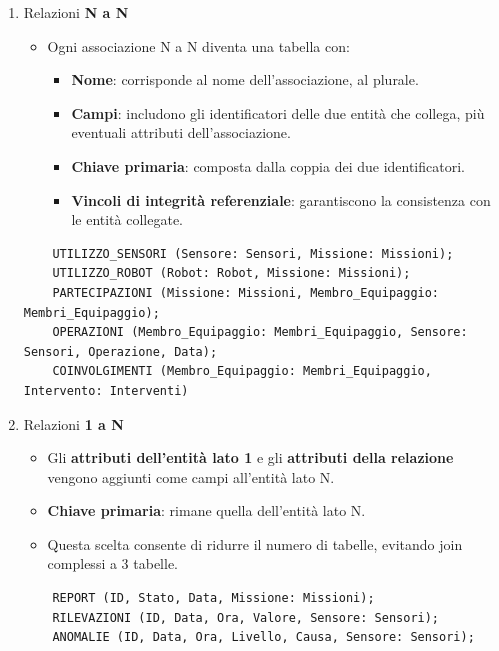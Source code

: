 \documentclass{article}
\begin{document}
\begin{enumerate}
    \item Relazioni \textbf{N a N}
    \begin{itemize}
        \item Ogni associazione N a N diventa una tabella con:
        \begin{itemize}
            \item \textbf{Nome}: corrisponde al nome dell’associazione, al plurale.
            \item \textbf{Campi}: includono gli identificatori delle due entità che collega, più eventuali attributi dell’associazione.
            \item \textbf{Chiave primaria}: composta dalla coppia dei due identificatori.
            \item \textbf{Vincoli di integrità referenziale}: garantiscono la consistenza con le entità collegate.
        \end{itemize}
    \end{itemize}
    \begin{verbatim}
    UTILIZZO_SENSORI (Sensore: Sensori, Missione: Missioni);
    UTILIZZO_ROBOT (Robot: Robot, Missione: Missioni);
    PARTECIPAZIONI (Missione: Missioni, Membro_Equipaggio: Membri_Equipaggio);
    OPERAZIONI (Membro_Equipaggio: Membri_Equipaggio, Sensore: Sensori, Operazione, Data);
    COINVOLGIMENTI (Membro_Equipaggio: Membri_Equipaggio, Intervento: Interventi)
    \end{verbatim}

    \item Relazioni \textbf{1 a N}
    \begin{itemize}
        \item Gli \textbf{attributi dell’entità lato 1} e gli \textbf{attributi della relazione} vengono aggiunti come campi all’entità lato N.
        \item \textbf{Chiave primaria}: rimane quella dell’entità lato N.
        \item Questa scelta consente di ridurre il numero di tabelle, evitando join complessi a 3 tabelle.
    \end{itemize}
    \begin{verbatim}
    REPORT (ID, Stato, Data, Missione: Missioni);
    RILEVAZIONI (ID, Data, Ora, Valore, Sensore: Sensori);
    ANOMALIE (ID, Data, Ora, Livello, Causa, Sensore: Sensori);
    \end{verbatim}


\end{enumerate}
\end{document}

